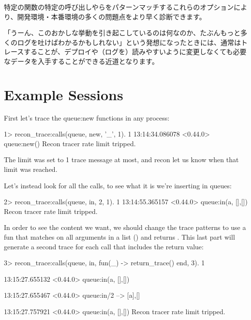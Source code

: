 特定の関数の特定の呼び出しやらをパターンマッチするこれらのオプションにより、開発環境・本番環境の多くの問題点をより早く診断できます。

「うーん、このおかしな挙動を引き起こしているのは何なのか、たぶんもっと多くのログを吐けばわかるかもしれない」という発想になったときには、通常はトレースすることが、デプロイや（ログを）読みやすいように変更しなくても必要なデータを入手することができる近道となります。


\section{Example Sessions}

First let's trace the queue:new functions in any process:

\begin{VerbatimEshell}
1> recon_trace:calls({queue, new, '_'}, 1).
1
13:14:34.086078 <0.44.0> queue:new()
Recon tracer rate limit tripped.
\end{VerbatimEshell}

The limit was set to 1 trace message at most, and recon let us know when that limit was reached.

Let's instead look for all the  calls, to see what it is we're inserting in queues:

\begin{VerbatimEshell}
2> recon_trace:calls({queue, in, 2}, 1).
1
13:14:55.365157 <0.44.0> queue:in(a, {[],[]})
Recon tracer rate limit tripped.
\end{VerbatimEshell}

In order to see the content we want, we should change the trace patterns to use a fun that matches on all arguments in a list (\term{\_}) and returns . This last part will generate a second trace for each call that includes the return value:

\begin{VerbatimEshell}
3> recon_trace:calls({queue, in, fun(_) -> return_trace() end}, 3).
1

13:15:27.655132 <0.44.0> queue:in(a, {[],[]})

13:15:27.655467 <0.44.0> queue:in/2 --> {[a],[]}

13:15:27.757921 <0.44.0> queue:in(a, {[],[]})
Recon tracer rate limit tripped.
\end{VerbatimEshell}

